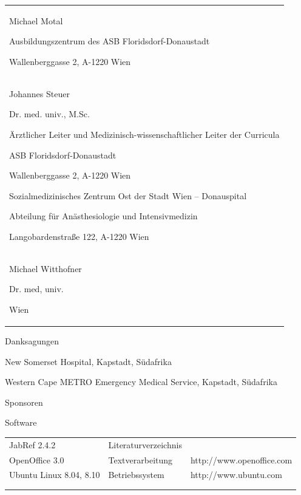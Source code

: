 \documentclass{article}
\begin{document}
\begin{multicols}{2}
\begin{center}
\begin{tabular}{m{6.813cm}}
\\
Michael Motal

Ausbildungszentrum des ASB Floridsdorf-Donaustadt

Wallenberggasse 2, A-1220 Wien

\\
Johannes Steuer

Dr. med. univ., M.Sc.

\"Arztlicher Leiter und Medizinisch-wissenschaftlicher Leiter der
Curricula

ASB Floridsdorf-Donaustadt

Wallenberggasse 2, A-1220 Wien

Sozialmedizinisches Zentrum Ost der Stadt Wien -- Donauspital

Abteilung f\"ur An\"asthesiologie und Intensivmedizin

Langobardenstra{\ss}e 122, A-1220 Wien

\\
Michael Witthofner

Dr. med, univ. 

Wien 

\\
\end{tabular}
\end{center}
\end{multicols}
Danksagungen

New Somerset Hospital, Kapstadt, S\"udafrika

Western Cape METRO Emergency Medical Service, Kapstadt, S\"udafrika

Sponsoren

Software

\begin{center}
\tablehead{}\begin{supertabular}{m{5.0740004cm}m{5.0740004cm}m{5.0740004cm}}
JabRef 2.4.2 

 &
\centering Literaturverzeichnis\par

 &
\\
OpenOffice 3.0

 &
\centering Textverarbeitung\par

 &
\raggedleft http://www.openoffice.com\par

\\
Ubuntu Linux 8.04, 8.10

 &
\centering Betriebssystem\par

 &
\raggedleft http://www.ubuntu.com\par

\\
 &
 &
\\
 &
 &
\\
\end{supertabular}
\end{center}
\end{document}
